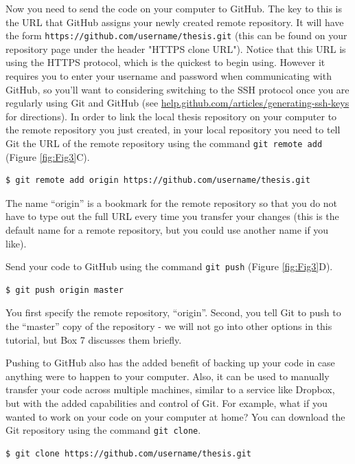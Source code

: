 \documentclass[10pt]{article}
\begin{document}
Now you need to send the code on your computer to GitHub.
The key to this is the URL that GitHub assigns your newly created remote repository.
It will have the form \verb|https://github.com/username/thesis.git| (this can be found on your repository page under the header "HTTPS clone URL").
Notice that this URL is using the HTTPS protocol, which is the quickest to begin using.
However it requires you to enter your username and password when communicating with GitHub, so you'll want to considering switching to the SSH protocol once you are regularly using Git and GitHub (see \href{https://help.github.com/articles/generating-ssh-keys/}{help.github.com/articles/generating-ssh-keys} for directions).
In order to link the local thesis repository on your computer to the remote repository you just created, in your local repository you need to tell Git the URL of the remote repository using the command \verb|git remote add| (Figure \ref{fig:Fig3}C).

\begin{verbatim}
$ git remote add origin https://github.com/username/thesis.git
\end{verbatim}

The name ``origin'' is a bookmark for the remote repository so that you do not have to type out the full URL every time you transfer your changes (this is the default name for a remote repository, but you could use another name if you like).

Send your code to GitHub using the command \verb|git push| (Figure \ref{fig:Fig3}D).

\begin{verbatim}
$ git push origin master
\end{verbatim}

You first specify the remote repository, ``origin''.
Second, you tell Git to push to the ``master'' copy of the repository - we will not go into other options in this tutorial, but Box 7 discusses them briefly.

Pushing to GitHub also has the added benefit of backing up your code in case anything were to happen to your computer.
Also, it can be used to manually transfer your code across multiple machines, similar to a service like Dropbox, but with the added capabilities and control of Git.
For example, what if you wanted to work on your code on your computer at home?
You can download the Git repository using the command \verb|git clone|.

\begin{verbatim}
$ git clone https://github.com/username/thesis.git
\end{verbatim}
\end{document}
